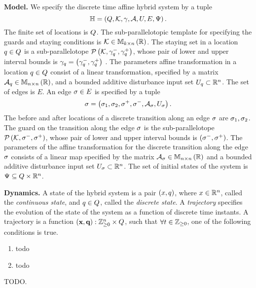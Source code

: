 {\bf Model.}  We specify the discrete time affine hybrid system
by a tuple 
\[
\mathbb{H} = \left(Q,\mathcal{K},\gamma,\mathcal{A},U,E,\Psi\right).
\]
%
The finite set of locations is $Q$.  The sub-parallelotopic
template for specifying the guards and staying conditions is
$\mathcal{K}\in\mathbb{M}_{k\times n}\left(\mathbb{R}\right)$.  The staying set in a location
$q\in Q$ is a sub-parallelotope
$\mathcal{P}\left(\mathcal{K},\gamma_q^-,\gamma_q^+\right)$, whose pair of
lower and upper interval bounds is
$\gamma_q=\left(\gamma_q^-,\gamma_q^+\right)$ .  The
parameters affine transformation in a location $q\in Q$
consist of a linear transformation, specified by a matrix
$\mathcal{A}_q\in\mathbb{M}_{n\times n}\left(\mathbb{R}\right)$, and a bounded additive
disturbance input set $U_q\subset\mathbb{R}^n$.  The set of
edges is $E$.  An edge $\sigma\in E$ is specified by a tuple
%
\[
\sigma=\left(\sigma_1,\sigma_2,\sigma^+,\sigma^-,\mathcal{A}_\sigma,U_\sigma\right).
\]
%
The before and after locations of a discrete transition along an edge
$\sigma$ are $\sigma_1,\sigma_2$.  The guard on the transition along the
edge $\sigma$ is the sub-parallelotope
$\mathcal{P}\left(\mathcal{K},\sigma^-,\sigma^+\right)$, whose pair of
lower and upper interval bounds is
$\left({\sigma^-},{\sigma^+}\right)$.
The parameters of the affine transformation for the discrete
transition along the edge $\sigma$ consists of a linear map specified
by the matrix $\mathcal{A}_\sigma\in\mathbb{M}_{n\times n}\left(\mathbb{R}\right)$ and a bounded
additive disturbance input set $U_\sigma\subset\mathbb{R}^n$.  The
set of initial states of the system is $\Psi\subseteq Q\times\mathbb{R}^n$.

{\bf Dynamics.}  A state of the hybrid system is a pair $(x,q)$,
where $x\in\mathbb{R}^n$, called the {\it continuous state}, and
$q\in Q$, called the {\it discrete state}.  A {\it
  trajectory} specifies the evolution of the state of the system as a
function of discrete time instants.  A trajectory is a function
$\maphtrj:\integers_{\geq 0}\ra\reals^n\times\locations$, such that
$\forall t\in\mathbb{Z}_{\geq 0}$, one of the following conditions is
true.
%
\begin{enumerate}
\item todo
\item todo
\end{enumerate}
%































{\color{red} TODO.}